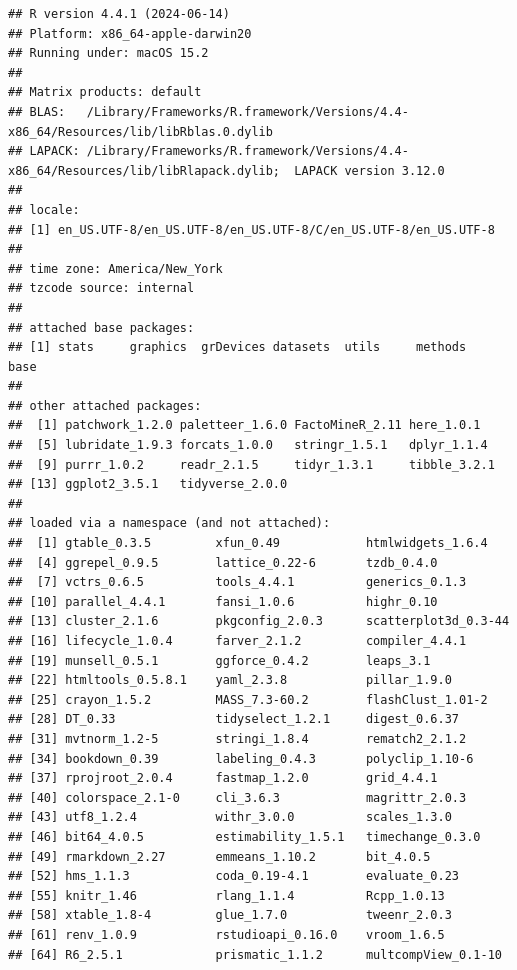 \documentclass[
]{book}
\begin{document}
\begin{verbatim}
## R version 4.4.1 (2024-06-14)
## Platform: x86_64-apple-darwin20
## Running under: macOS 15.2
## 
## Matrix products: default
## BLAS:   /Library/Frameworks/R.framework/Versions/4.4-x86_64/Resources/lib/libRblas.0.dylib 
## LAPACK: /Library/Frameworks/R.framework/Versions/4.4-x86_64/Resources/lib/libRlapack.dylib;  LAPACK version 3.12.0
## 
## locale:
## [1] en_US.UTF-8/en_US.UTF-8/en_US.UTF-8/C/en_US.UTF-8/en_US.UTF-8
## 
## time zone: America/New_York
## tzcode source: internal
## 
## attached base packages:
## [1] stats     graphics  grDevices datasets  utils     methods   base     
## 
## other attached packages:
##  [1] patchwork_1.2.0 paletteer_1.6.0 FactoMineR_2.11 here_1.0.1     
##  [5] lubridate_1.9.3 forcats_1.0.0   stringr_1.5.1   dplyr_1.1.4    
##  [9] purrr_1.0.2     readr_2.1.5     tidyr_1.3.1     tibble_3.2.1   
## [13] ggplot2_3.5.1   tidyverse_2.0.0
## 
## loaded via a namespace (and not attached):
##  [1] gtable_0.3.5         xfun_0.49            htmlwidgets_1.6.4   
##  [4] ggrepel_0.9.5        lattice_0.22-6       tzdb_0.4.0          
##  [7] vctrs_0.6.5          tools_4.4.1          generics_0.1.3      
## [10] parallel_4.4.1       fansi_1.0.6          highr_0.10          
## [13] cluster_2.1.6        pkgconfig_2.0.3      scatterplot3d_0.3-44
## [16] lifecycle_1.0.4      farver_2.1.2         compiler_4.4.1      
## [19] munsell_0.5.1        ggforce_0.4.2        leaps_3.1           
## [22] htmltools_0.5.8.1    yaml_2.3.8           pillar_1.9.0        
## [25] crayon_1.5.2         MASS_7.3-60.2        flashClust_1.01-2   
## [28] DT_0.33              tidyselect_1.2.1     digest_0.6.37       
## [31] mvtnorm_1.2-5        stringi_1.8.4        rematch2_2.1.2      
## [34] bookdown_0.39        labeling_0.4.3       polyclip_1.10-6     
## [37] rprojroot_2.0.4      fastmap_1.2.0        grid_4.4.1          
## [40] colorspace_2.1-0     cli_3.6.3            magrittr_2.0.3      
## [43] utf8_1.2.4           withr_3.0.0          scales_1.3.0        
## [46] bit64_4.0.5          estimability_1.5.1   timechange_0.3.0    
## [49] rmarkdown_2.27       emmeans_1.10.2       bit_4.0.5           
## [52] hms_1.1.3            coda_0.19-4.1        evaluate_0.23       
## [55] knitr_1.46           rlang_1.1.4          Rcpp_1.0.13         
## [58] xtable_1.8-4         glue_1.7.0           tweenr_2.0.3        
## [61] renv_1.0.9           rstudioapi_0.16.0    vroom_1.6.5         
## [64] R6_2.5.1             prismatic_1.1.2      multcompView_0.1-10
\end{verbatim}
\end{document}
